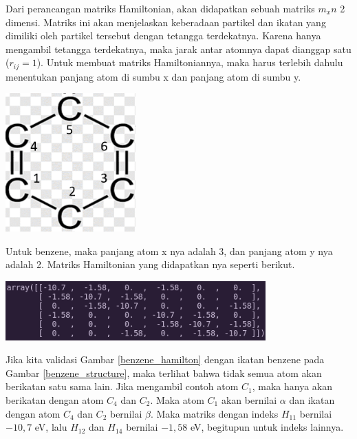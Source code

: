 \documentclass[12pt,a4paper]{report}
\begin{document}
Dari perancangan matriks Hamiltonian, akan didapatkan sebuah matriks $m_{x}n$ 2 dimensi. Matriks ini akan menjelaskan keberadaan partikel dan ikatan yang dimiliki oleh partikel tersebut dengan tetangga terdekatnya. Karena hanya mengambil tetangga terdekatnya, maka jarak antar atomnya dapat dianggap satu ($r_{ij}=1$). Untuk membuat matriks Hamiltoniannya, maka harus terlebih dahulu menentukan panjang atom di sumbu x dan panjang atom di sumbu y. 
\begin{center}
	\includegraphics[width=5cm]{gambar/benzene.png}
	\label{benzene_structure}
\end{center}
Untuk benzene, maka panjang atom x nya adalah 3, dan panjang atom y nya adalah 2. Matriks Hamiltonian yang didapatkan nya seperti berikut.
\begin{center}
	\includegraphics[width=10cm]{gambar/benzene-hamiltonian.png}
	\label{benzene_hamilton}
\end{center}

Jika kita validasi Gambar \ref{benzene_hamilton} dengan ikatan benzene pada Gambar \ref{benzene_structure}, maka terlihat bahwa tidak semua atom akan berikatan satu sama lain. Jika mengambil contoh atom $C_1$, maka hanya akan berikatan dengan atom $C_4$ dan $C_2$. Maka atom $C_1$ akan bernilai $\alpha$ dan ikatan dengan atom $C_4$ dan $C_2$ bernilai $\beta$. Maka matriks dengan indeks $H_{11}$ bernilai $-10,7$ eV, lalu $H_{12}$ dan $H_{14}$ bernilai $-1,58$ eV, begitupun untuk indeks lainnya.
\end{document}
